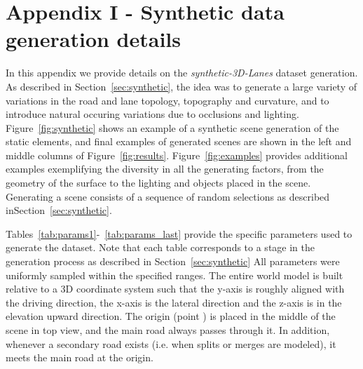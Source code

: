 \documentclass[10pt,twocolumn,letterpaper]{article}
\begin{document}
\clearpage
\newpage

\section*{Appendix I - Synthetic data generation details}


In this appendix we provide details on the \textit{synthetic-3D-Lanes} dataset generation. As described in Section~\ref{sec:synthetic}, the idea was to generate a large variety of variations in the road and lane topology, topography and curvature, and to introduce natural occuring variations due to occlusions and lighting. Figure~\ref{fig:synthetic} shows an example of a synthetic scene generation of the static elements, and final examples of generated scenes are shown in the left and middle columns of Figure~\ref{fig:results}. Figure~\ref{fig:examples} provides additional examples exemplifying the diversity in all the generating factors, from the geometry of the surface to the lighting and objects placed in the scene. Generating a scene consists of a sequence of random selections as described inSection~\ref{sec:synthetic}.

Tables~\ref{tab:params1}-~\ref{tab:params_last} provide the specific parameters used to generate the dataset. Note that each table corresponds to a stage in the generation process as described in Section~\ref{sec:synthetic} All parameters were uniformly sampled within the specified ranges. The entire world model is built relative to a 3D coordinate system such that the y-axis is roughly aligned with the driving direction, the x-axis is the lateral direction and the z-axis is in the elevation upward direction. The origin (point ) is placed in the middle of the scene in top view, and the main road always passes through it. In addition, whenever a secondary road exists (i.e. when splits or merges are modeled), it meets the main road at the origin. 
\end{document}
